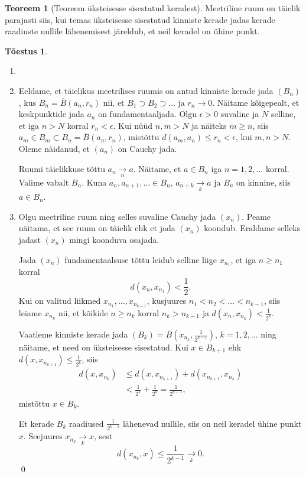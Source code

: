 \documentclass{article}[12pt]
\theoremstyle{definition}
\theoremstyle{definition}
\newtheorem{theorem}{Teoreem}[section]
\theoremstyle{definition}
\theoremstyle{break}
\newtheorem*{toestus}{Tõestus}
\begin{document}
\begin{theorem}[Teoreem üksteisesse sisestatud keradest]
	Meetriline ruum on täielik parajasti siis, kui temas üksteisesse sisestatud kinniste kerade jadas kerade raadiuste nullile lähenemisest järeldub, et neil keradel on ühine punkt.
\end{theorem}
\begin{toestus}
	\begin{enumerate}
		\item[]
		\item Eeldame, et täielikus meetrilises ruumis on antud kinniste kerade jada $(B_n)$, kus $B_n = \overline{B}(a_n,r_n)$ nii, et $B_1\supset B_2\supset \dots$ ja $r_n\rightarrow 0$.
		Näitame kõigepealt, et keskpunktide jada $a_n$ on fundamentaaljada.
		Olgu $\epsilon > 0$ suvaline ja $N$ selline, et iga $n>N$ korral $r_n < \epsilon$.
		Kui nüüd $n,m>N$ ja näiteks $m\geq n$, siis $a_m\in B_m\subset B_n = \overline{B}(a_n,r_n)$, mistõttu $d(a_m,a_n)\leq r_n<\epsilon$, kui $m,n > N$.
		Oleme näidanud, et $(a_n)$ on Cauchy jada.

		Ruumi täielikkuse tõttu $a_n\underset{n}{\rightarrow} a$.
		Näitame, et $a\in B_n$ iga $n=1,2,\dots$ korral.
		Valime vabalt $B_n$. 
		Kuna $a_n,a_{n+1},\dots\in B_n$, $a_{n+k}\underset{k}{\rightarrow}a$ ja $B_n$ on kinnine, siis $a\in B_n$.
		\item Olgu meetriline ruum ning selles suvaline Cauchy jada $(x_n)$.
		Peame näitama, et see ruum on täielik ehk et jada $(x_n)$ koondub.
		Eraldame selleks jadast $(x_n)$ mingi koonduva osajada.

		Jada $(x_n)$ fundamentaalsuse tõttu leidub selline liige $x_{n_1}$, et iga $n\geq n_1$ korral 
		\[
			d(x_n,x_{n_1})<\frac{1}{2}.
		\]
		Kui on valitud liikmed $x_{n_1},\dots,x_{n_{k-1}}$, kusjuures $n_1<n_2<\dots<n_{k-1}$, siis leiame $x_{n_k}$ nii, et kõikide $n\geq n_k$ korral $n_k > n_{k-1}$ ja $d(x_n,x_{n_k}) < \frac{1}{2^k}$.

		Vaatleme kinniste kerade jada $(B_k)=\overline{B}(x_{n_k},\frac{1}{2^{k-1}})$, $k=1,2,\dots$ ning näitame, et need on üksteisesse sisestatud.
		Kui $x\in B_{k+1}$ ehk $d(x,x_{n_{k+1}})\leq \frac{1}{2^k}$, siis
		\begin{align*}
			d(x,x_{n_k}) &\leq d(x,x_{n_{k+1}}) + d(x_{n_{k+1}},x_{n_k}) \\
			&< \frac{1}{2^k} + \frac{1}{2^k} = \frac{1}{2^{k-1}},
		\end{align*}
		mistõttu $x\in B_k$.

		Et kerade $B_k$ raadiused $\frac{1}{2^{k-1}}$ lähenevad nullile, siis on neil keradel ühine punkt $x$.
		Seejuures $x_{n_k}\underset{k}{\rightarrow}x$, sest
		\[
			d(x_{n_k},x)\leq \frac{1}{2^{k-1}} \underset{k}{\rightarrow} 0.
		\]
		\qed
	\end{enumerate}
\end{toestus}
\end{document}
